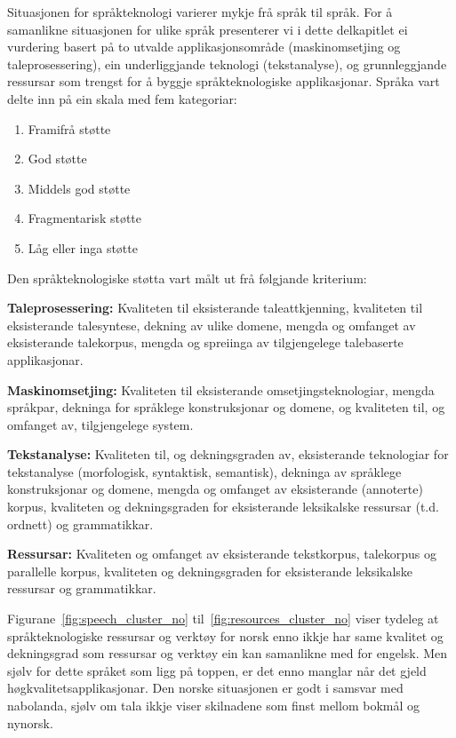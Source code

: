 \begin{multicols}{2}
Situasjonen for språkteknologi varierer mykje frå språk til språk. For å samanlikne situasjonen for ulike språk presenterer vi i dette delkapitlet ei vurdering basert på to utvalde applikasjonsområde (maskinomsetjing og taleprosessering), ein underliggjande teknologi (tekstanalyse), og grunnleggjande ressursar som trengst for å byggje språkteknologiske applikasjonar. Språka vart delte inn på ein skala med fem kategoriar:

\begin{enumerate}
\item Framifrå støtte
\item God støtte
\item Middels god støtte 
\item Fragmentarisk støtte
\item Låg eller inga støtte
\end{enumerate}

Den språkteknologiske støtta vart målt ut frå følgjande kriterium:

\textbf{Taleprosessering:} Kvaliteten til eksisterande taleattkjenning, kvaliteten til eksisterande talesyntese, dekning av ulike domene, mengda og omfanget av eksisterande talekorpus, mengda og spreiinga av tilgjengelege talebaserte applikasjonar.

\textbf{Maskinomsetjing:} Kvaliteten til eksisterande omsetjingsteknologiar, mengda språkpar, dekninga for språklege konstruksjonar og domene, og kvaliteten til, og omfanget av, tilgjengelege system.

\textbf{Tekstanalyse:} Kvaliteten til, og dekningsgraden av, eksisterande teknologiar for tekstanalyse (morfologisk, syntaktisk, semantisk), dekninga av språklege konstruksjonar og domene, mengda og omfanget av eksisterande (annoterte) korpus, kvaliteten og dekningsgraden for eksisterande leksikalske ressursar (t.d. ordnett) og grammatikkar.

\textbf{Ressursar:} Kvaliteten og omfanget av eksisterande tekstkorpus, talekorpus og parallelle korpus, kvaliteten og dekningsgraden for eksisterande leksikalske ressursar og grammatikkar.

Figurane~\ref{fig:speech_cluster_no} til~\ref{fig:resources_cluster_no} viser tydeleg at språkteknologiske ressursar og verktøy for norsk enno ikkje har same kvalitet og dekningsgrad som ressursar og verktøy ein kan samanlikne med for engelsk. Men sjølv for dette språket som ligg på toppen, er det enno manglar når det gjeld høgkvalitetsapplikasjonar. 
Den norske situasjonen er godt i samsvar med nabolanda, sjølv om tala ikkje viser skilnadene som finst mellom bokmål og nynorsk.


\end{multicols}
